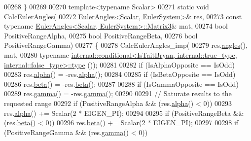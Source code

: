 \begin{DoxyCode}
00268     \}
00269     
00270     \textcolor{keyword}{template}<\textcolor{keyword}{typename} Scalar>
00271     \textcolor{keyword}{static} \textcolor{keywordtype}{void} CalcEulerAngles(
00272       \hyperlink{class_eigen_1_1_euler_angles}{EulerAngles<Scalar, EulerSystem>}& res,
00273       \textcolor{keyword}{const} \textcolor{keyword}{typename} \hyperlink{group___core___module_class_eigen_1_1_matrix}{EulerAngles<Scalar, EulerSystem>::Matrix3}& 
      mat,
00274       \textcolor{keywordtype}{bool} PositiveRangeAlpha,
00275       \textcolor{keywordtype}{bool} PositiveRangeBeta,
00276       \textcolor{keywordtype}{bool} PositiveRangeGamma)
00277     \{
00278       CalcEulerAngles\_imp(
00279         res.\hyperlink{class_eigen_1_1_euler_angles_a2decf84b5efd265f7251fd32f539a36b}{angles}(), mat,
00280         \textcolor{keyword}{typename} 
      \hyperlink{class_eigen_1_1internal_1_1_tensor_lazy_evaluator_writable}{internal::conditional<IsTaitBryan, internal::true\_type, internal::false\_type>::type}
      ());
00281 
00282       \textcolor{keywordflow}{if} (IsAlphaOpposite == IsOdd)
00283         res.\hyperlink{class_eigen_1_1_euler_angles_a6146f78ee0fb9d9a7d685a4654066825}{alpha}() = -res.\hyperlink{class_eigen_1_1_euler_angles_a6146f78ee0fb9d9a7d685a4654066825}{alpha}();
00284         
00285       \textcolor{keywordflow}{if} (IsBetaOpposite == IsOdd)
00286         res.\hyperlink{class_eigen_1_1_euler_angles_a1bf59f8acaed985964c98c1f59d8f5ab}{beta}() = -res.\hyperlink{class_eigen_1_1_euler_angles_a1bf59f8acaed985964c98c1f59d8f5ab}{beta}();
00287         
00288       \textcolor{keywordflow}{if} (IsGammaOpposite == IsOdd)
00289         res.\hyperlink{class_eigen_1_1_euler_angles_aa75a5f16105d96eedf81bf9f8e789e21}{gamma}() = -res.\hyperlink{class_eigen_1_1_euler_angles_aa75a5f16105d96eedf81bf9f8e789e21}{gamma}();
00290       
00291       \textcolor{comment}{// Saturate results to the requested range}
00292       \textcolor{keywordflow}{if} (PositiveRangeAlpha && (res.\hyperlink{class_eigen_1_1_euler_angles_a6146f78ee0fb9d9a7d685a4654066825}{alpha}() < 0))
00293         res.\hyperlink{class_eigen_1_1_euler_angles_a6146f78ee0fb9d9a7d685a4654066825}{alpha}() += Scalar(2 * EIGEN\_PI);
00294       
00295       \textcolor{keywordflow}{if} (PositiveRangeBeta && (res.\hyperlink{class_eigen_1_1_euler_angles_a1bf59f8acaed985964c98c1f59d8f5ab}{beta}() < 0))
00296         res.\hyperlink{class_eigen_1_1_euler_angles_a1bf59f8acaed985964c98c1f59d8f5ab}{beta}() += Scalar(2 * EIGEN\_PI);
00297       
00298       \textcolor{keywordflow}{if} (PositiveRangeGamma && (res.\hyperlink{class_eigen_1_1_euler_angles_aa75a5f16105d96eedf81bf9f8e789e21}{gamma}() < 0))

\end{DoxyCode}
